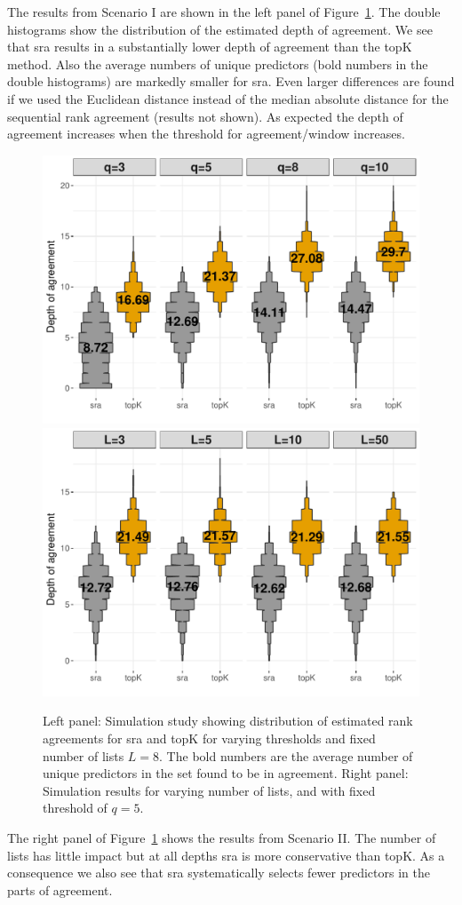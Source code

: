 \documentclass[12pt,a4paper]{article}
\theoremstyle{plain}
\begin{document}
The results from Scenario I are shown in the left panel of
Figure~\ref{fig:example99}. The double histograms show the
distribution of the estimated depth of agreement. We see that sra
results in a substantially lower depth of agreement than the topK
method. Also the average numbers of unique predictors (bold numbers in
the double histograms) are markedly smaller for sra. Even larger
differences are found if we used the Euclidean distance instead of the
median absolute distance for the sequential rank agreement (results
not shown). As expected the depth of agreement increases when the
threshold for agreement/window increases.
\begin{figure}[htbp]
   \begin{center}
 \includegraphics[width=.49\textwidth]{Ksim.pdf}
 \includegraphics[width=.49\textwidth]{Lsim}
 \end{center}
 \caption{Left panel: Simulation study showing distribution of
   estimated rank agreements for sra and topK for varying thresholds
   and fixed number of lists $L=8$. The bold numbers are the average
   number of unique predictors in the set found to be in
   agreement. Right panel: Simulation results for varying number of
   lists, and with fixed threshold of $q=5$.}
 \label{fig:example99}
 \end{figure}
 The right panel of Figure~\ref{fig:example99} shows the results from
 Scenario II. The number of lists has little impact but at all depths
 sra is more conservative than topK. As a consequence we also see that
 sra systematically selects fewer predictors in the parts of
 agreement.
 
\end{document}
